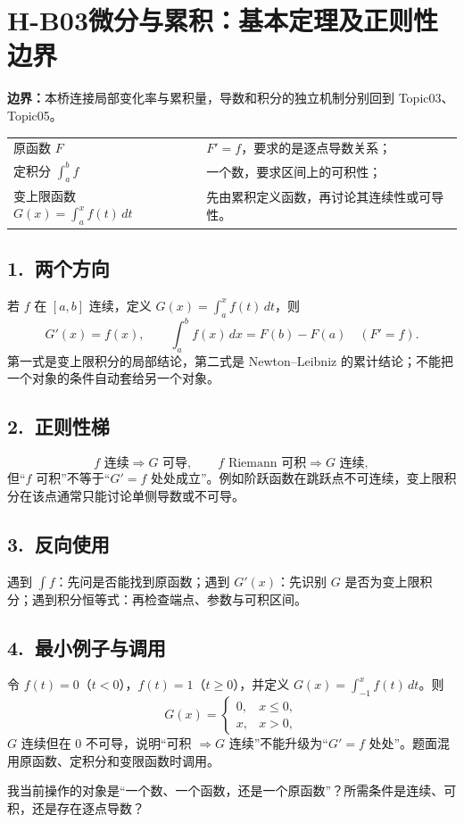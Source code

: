 \documentclass[UTF8,a4paper,10pt]{ctexart}
\begin{document}
\section*{H-B03\quad 微分与累积：基本定理及正则性边界}
\textbf{边界：}本桥连接局部变化率与累积量，导数和积分的独立机制分别回到 Topic03、Topic05。
\begin{tcolorbox}[title=三类对象必须分开]
\begin{tabularx}{\linewidth}{@{}lX@{}}
原函数 $F$ & $F'=f$，要求的是逐点导数关系；\\
定积分 $\int_a^b f$ & 一个数，要求区间上的可积性；\\
变上限函数 $G(x)=\int_a^x f(t)\,dt$ & 先由累积定义函数，再讨论其连续性或可导性。
\end{tabularx}
\end{tcolorbox}
\subsection*{1.\ 两个方向}
若 $f$ 在 $[a,b]$ 连续，定义 $G(x)=\int_a^x f(t)\,dt$，则
\[
G'(x)=f(x),\qquad \int_a^b f(x)\,dx=F(b)-F(a)\quad(F'=f).
\]
第一式是变上限积分的局部结论，第二式是 Newton--Leibniz 的累计结论；不能把一个对象的条件自动套给另一个对象。
\subsection*{2.\ 正则性梯}
\[
f\text{ 连续}\Rightarrow G\text{ 可导},\qquad
f\text{ Riemann 可积}\Rightarrow G\text{ 连续},
\]
但“$f$ 可积”不等于“$G'=f$ 处处成立”。例如阶跃函数在跳跃点不可连续，变上限积分在该点通常只能讨论单侧导数或不可导。
\subsection*{3.\ 反向使用}
遇到 $\int f$：先问是否能找到原函数；遇到 $G'(x)$：先识别 $G$ 是否为变上限积分；遇到积分恒等式：再检查端点、参数与可积区间。
\subsection*{4.\ 最小例子与调用}
令 $f(t)=0$（$t<0$），$f(t)=1$（$t\ge0$），并定义 $G(x)=\int_{-1}^{x}f(t)\,dt$。则
\[
G(x)=\begin{cases}0,&x\le0,\\x,&x>0,\end{cases}
\]
$G$ 连续但在 $0$ 不可导，说明“可积 $\Rightarrow G$ 连续”不能升级为“$G'=f$ 处处”。题面混用原函数、定积分和变限函数时调用。
\begin{tcolorbox}[title=检查句]
我当前操作的对象是“一个数、一个函数，还是一个原函数”？所需条件是连续、可积，还是存在逐点导数？
\end{tcolorbox}
\end{document}

